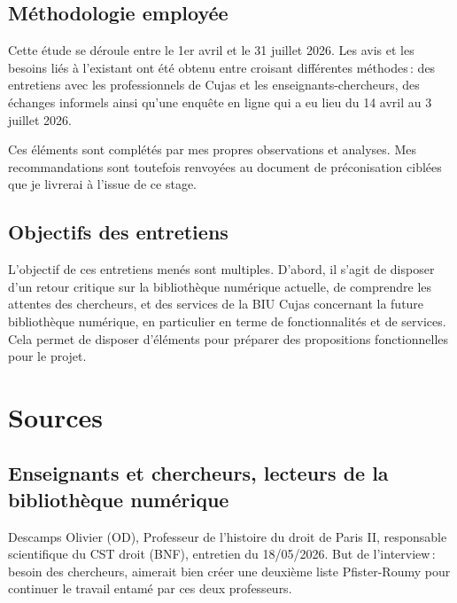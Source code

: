 \subsection*{Méthodologie employée}

Cette étude se déroule entre le 1er avril et le 31 juillet 2026. Les avis et les besoins liés à l’existant ont été obtenu entre croisant différentes méthodes : des entretiens avec les professionnels de Cujas et les enseignants-chercheurs, des échanges informels ainsi qu’une enquête en ligne qui a eu lieu du 14 avril au 3 juillet 2026. 

Ces éléments sont complétés par mes propres observations et analyses. Mes recommandations sont toutefois renvoyées au document de préconisation ciblées que je livrerai à l’issue de ce stage. 

\subsection*{Objectifs des entretiens}  

L’objectif de ces entretiens menés sont multiples. D’abord, il s’agit de disposer d’un retour critique sur la bibliothèque numérique actuelle, de comprendre les attentes des chercheurs, et des services de la BIU Cujas concernant la future bibliothèque numérique, en particulier en terme de fonctionnalités et de services. Cela permet de disposer d’éléments pour préparer des propositions fonctionnelles pour le projet. 





\section*{Sources} 


\subsection*{Enseignants et chercheurs, lecteurs de la bibliothèque numérique} 

Descamps Olivier (OD), Professeur de l’histoire du droit de Paris II, responsable scientifique du CST droit (BNF), entretien du 18/05/2026. But de l’interview : besoin des chercheurs, aimerait bien créer une deuxième liste Pfister-Roumy pour continuer le travail entamé par ces deux professeurs.  

